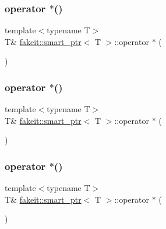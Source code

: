 \subsubsection{\texorpdfstring{operator $\ast$()}{operator *()}\hspace{0.1cm}{\footnotesize\ttfamily [3/9]}}
{\footnotesize\ttfamily template$<$typename T$>$ \\
T\& \mbox{\hyperlink{classfakeit_1_1smart__ptr}{fakeit\+::smart\+\_\+ptr}}$<$ T $>$\+::operator $\ast$ (\begin{DoxyParamCaption}{ }\end{DoxyParamCaption})\hspace{0.3cm}{\ttfamily [inline]}}

\mbox{\label{classfakeit_1_1smart__ptr_a6ad907f45c59a2519248f5a79191992e}} 
\subsubsection{\texorpdfstring{operator $\ast$()}{operator *()}\hspace{0.1cm}{\footnotesize\ttfamily [4/9]}}
{\footnotesize\ttfamily template$<$typename T$>$ \\
T\& \mbox{\hyperlink{classfakeit_1_1smart__ptr}{fakeit\+::smart\+\_\+ptr}}$<$ T $>$\+::operator $\ast$ (\begin{DoxyParamCaption}{ }\end{DoxyParamCaption})\hspace{0.3cm}{\ttfamily [inline]}}

\mbox{\label{classfakeit_1_1smart__ptr_a6ad907f45c59a2519248f5a79191992e}} 
\subsubsection{\texorpdfstring{operator $\ast$()}{operator *()}\hspace{0.1cm}{\footnotesize\ttfamily [5/9]}}
{\footnotesize\ttfamily template$<$typename T$>$ \\
T\& \mbox{\hyperlink{classfakeit_1_1smart__ptr}{fakeit\+::smart\+\_\+ptr}}$<$ T $>$\+::operator $\ast$ (\begin{DoxyParamCaption}{ }\end{DoxyParamCaption})\hspace{0.3cm}{\ttfamily [inline]}}

